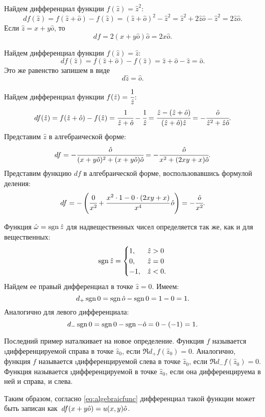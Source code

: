 \begin{example}
	Найдем дифференциал функции $f(\hat{z})=\hat{z}^2$:
		$$df(\hat{z})=f(\hat{z}+\hat{o})-f(\hat{z})=(\hat{z}+\hat{o})^2-\hat{z}^2=\hat{z}^2+2\hat{z}\hat{o}-\hat{z}^2=2\hat{z}\hat{o}.$$
	Если $\hat{z}=x+y\hat{o}$, то
		$$df=2(x+y\hat{o})\hat{o}=2x\hat{o}.$$
\end{example}
\begin{example}
	Найдем дифференциал функции $f(\hat{z})=\hat{z}$:
		$$df(\hat{z})=f(\hat{z}+\hat{o})-f(\hat{z})=\hat{z}+\hat{o}-\hat{z}=\hat{o}.$$
	Это же равенство запишем в виде
		\begin{equation}
			d\hat{z}=\hat{o}.
		\end{equation}
\end{example}
\begin{example}
	Найдем дифференциал функции $f(\hat{z})=\cfrac{1}{\hat{z}}$:
		$$df(\hat{z})=f(\hat{z}+\hat{o})-f(\hat{z})=\cfrac{1}{\hat{z}+\hat{o}}-\cfrac{1}{\hat{z}}=\cfrac{\hat{z}-(\hat{z}+\hat{o})}{(\hat{z}+\hat{o})\hat{z}}=-\cfrac{\hat{o}}{\hat{z}^2+\hat{z}\hat{o}}.$$
	Представим $\hat{z}$ в алгебраической форме:
		$$df=-\cfrac{\hat{o}}{(x+y\hat{o})^2+(x+y\hat{o})\hat{o}}=-\cfrac{\hat{o}}{x^2+(2xy+x)\hat{o}}.$$
	Представим функцию $df$ в алгебраической форме, воспользовавшись формулой деления:
		$$df=-\left(\cfrac{0}{x^2}+\cfrac{x^2\cdot 1-0\cdot(2xy+x)}{x^4}\,\hat{o}\right)=-\cfrac{\hat{o}}{x^2}.$$
\end{example}
\begin{example} Функция $\hat{\omega}=\operatorname{sgn}{\hat{z}}$ для надвещественных чисел определяется так же, как и для вещественных:
	\begin{equation*}
		\operatorname{sgn}{\hat{z}} = \begin{cases}
			1, & \hat{z}>0 \\
			0, & \hat{z}=0 \\
			-1, & \hat{z}<0.
		\end{cases}
	\end{equation*}
	Найдем ее правый дифференциал в точке $\hat{z}=0$. Имеем:
		$$d_{+}\operatorname{sgn}{0}=\operatorname{sgn}{\hat{o}}-\operatorname{sgn}{0}=1-0=1.$$
	Аналогично для левого дифференциала:
		$$d_{-}\operatorname{sgn}{0}=\operatorname{sgn}{0}-\operatorname{sgn}{-\hat{o}}=0-(-1)=1.$$
\end{example}
Последний пример наталкивает на новое определение. Функция $f$ называется \i{дифференцируемой справа в точке $\hat{z}_0$}, если $\Re{d_{+}f(\hat{z}_0)}=0$. Аналогично, функция $f$ называется \i{дифференцируемой слева в точке $\hat{z}_0$}, если $\Re{d_{-}f(\hat{z}_0)}=0$. Функция называется \i{дифференцируемой в точке $\hat{z}_0$}, если она дифференцируема в ней и справа, и слева.\par
Таким образом, согласно \eqref{eq:algebraicfunc} дифференциал такой функции может быть записан как~$df(x+y\hat{o})\hm=u(x, y)\hat{o}$.

